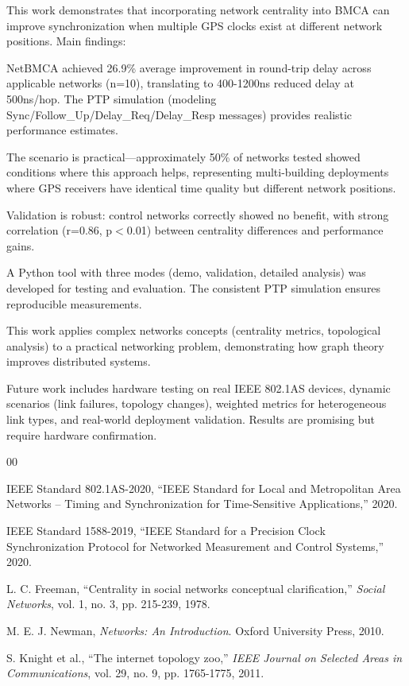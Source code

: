 \documentclass[conference]{IEEEtran}
\begin{document}
This work demonstrates that incorporating network centrality into BMCA can improve synchronization when multiple GPS clocks exist at different network positions. Main findings:

NetBMCA achieved 26.9\% average improvement in round-trip delay across applicable networks (n=10), translating to 400-1200ns reduced delay at 500ns/hop. The PTP simulation (modeling Sync/Follow\_Up/Delay\_Req/Delay\_Resp messages) provides realistic performance estimates.

The scenario is practical---approximately 50\% of networks tested showed conditions where this approach helps, representing multi-building deployments where GPS receivers have identical time quality but different network positions.

Validation is robust: control networks correctly showed no benefit, with strong correlation (r=0.86, p$<$0.01) between centrality differences and performance gains.

A Python tool with three modes (demo, validation, detailed analysis) was developed for testing and evaluation. The consistent PTP simulation ensures reproducible measurements.

This work applies complex networks concepts (centrality metrics, topological analysis) to a practical networking problem, demonstrating how graph theory improves distributed systems.

Future work includes hardware testing on real IEEE 802.1AS devices, dynamic scenarios (link failures, topology changes), weighted metrics for heterogeneous link types, and real-world deployment validation. Results are promising but require hardware confirmation.

\begin{thebibliography}{00}

 IEEE Standard 802.1AS-2020, ``IEEE Standard for Local and Metropolitan Area Networks -- Timing and Synchronization for Time-Sensitive Applications,'' 2020.

 IEEE Standard 1588-2019, ``IEEE Standard for a Precision Clock Synchronization Protocol for Networked Measurement and Control Systems,'' 2020.

 L. C. Freeman, ``Centrality in social networks conceptual clarification,'' \textit{Social Networks}, vol. 1, no. 3, pp. 215-239, 1978.

 M. E. J. Newman, \textit{Networks: An Introduction}. Oxford University Press, 2010.

 S. Knight et al., ``The internet topology zoo,'' \textit{IEEE Journal on Selected Areas in Communications}, vol. 29, no. 9, pp. 1765-1775, 2011.

\end{thebibliography}
\end{document}
